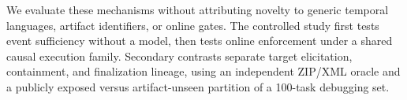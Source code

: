 We evaluate these mechanisms without attributing novelty to generic temporal
languages, artifact identifiers, or online gates. The controlled study first
tests event sufficiency without a model, then tests online enforcement under a
shared causal execution family. Secondary contrasts separate target
elicitation, containment, and finalization lineage, using an independent
ZIP/XML oracle and a publicly exposed versus artifact-unseen partition of a
100-task debugging set.
